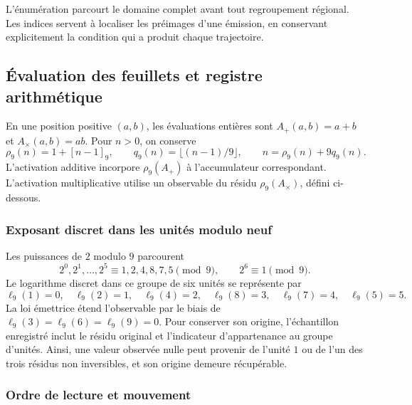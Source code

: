 L'énumération parcourt le domaine complet avant tout regroupement
régional. Les indices servent à localiser les préimages d'une
émission, en conservant explicitement la condition qui a produit chaque trajectoire.

\subsection{Évaluation des feuillets et registre arithmétique}
\label{act21:tpk:lecturas}

En une position positive \((a,b)\), les évaluations entières sont
\(A_+(a,b)=a+b\) et \(A_\times(a,b)=ab\). Pour \(n>0\), on conserve
\begin{equation}
 \rho_9(n)=1+[n-1]_9,\qquad
 q_9(n)=\lfloor(n-1)/9\rfloor,\qquad
 n=\rho_9(n)+9q_9(n).
 \label{act21:tpk:division-evaluacion}
\end{equation}
L'activation additive incorpore \(\rho_9(A_+)\) à l'accumulateur correspondant. L'activation multiplicative utilise un observable du résidu \(\rho_9(A_\times)\), défini ci-dessous.

\subsubsection{Exposant discret dans les unités modulo neuf}

Les puissances de \(2\) modulo \(9\) parcourent
\[
 2^0,2^1,\ldots,2^5\equiv1,2,4,8,7,5\pmod9,
 \qquad 2^6\equiv1\pmod9.
\]
Le logarithme discret dans ce groupe de six unités se représente par
\begin{equation}
 \ell_9(1)=0,\quad\ell_9(2)=1,\quad\ell_9(4)=2,
 \quad\ell_9(8)=3,\quad\ell_9(7)=4,\quad\ell_9(5)=5.
 \label{act21:tpk:logaritmo}
\end{equation}
La loi émettrice étend l'observable par le biais de \(\ell_9(3)=\ell_9(6)=\ell_9(9)=0\). Pour conserver son origine, l'échantillon enregistré inclut le résidu original et l'indicateur d'appartenance au groupe d'unités. Ainsi, une valeur observée nulle peut provenir de l'unité \(1\) ou de l'un des trois résidus non inversibles, et son origine demeure récupérable.



\subsubsection{Ordre de lecture et mouvement}

